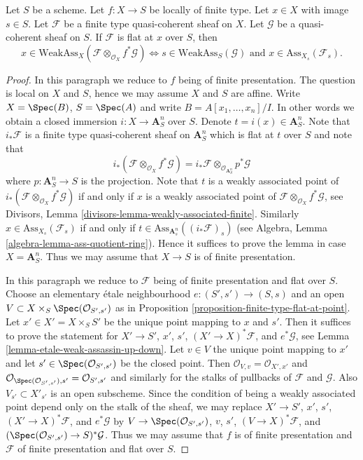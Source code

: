 \begin{lemma}
\label{lemma-bourbaki-finite-type-general-base-at-point}
Let $S$ be a scheme.
Let $f : X \to S$ be locally of finite type.
Let $x \in X$ with image $s \in S$.
Let $\mathcal{F}$ be a finite type quasi-coherent sheaf on $X$.
Let $\mathcal{G}$ be a quasi-coherent sheaf on $S$.
If $\mathcal{F}$ is flat at $x$ over $S$, then
$$
x \in \text{WeakAss}_X(\mathcal{F} \otimes_{\mathcal{O}_X} f^*\mathcal{G})
\Leftrightarrow
s \in \text{WeakAss}_S(\mathcal{G})
\text{ and }
x \in \text{Ass}_{X_s}(\mathcal{F}_s).
$$
\end{lemma}

\begin{proof}
In this paragraph we reduce to $f$ being of finite presentation.
The question is local on $X$ and $S$, hence we may assume $X$ and $S$
are affine. Write $X = \Spec(B)$, $S = \Spec(A)$ and write
$B = A[x_1, \ldots, x_n]/I$. In other words we obtain a closed immersion
$i : X \to \mathbf{A}^n_S$ over $S$. Denote $t = i(x) \in \mathbf{A}^n_S$.
Note that $i_*\mathcal{F}$ is a finite type quasi-coherent sheaf on
$\mathbf{A}^n_S$ which is flat at $t$ over $S$ and note that
$$
i_*(\mathcal{F} \otimes_{\mathcal{O}_X} f^*\mathcal{G}) =
i_*\mathcal{F} \otimes_{\mathcal{O}_{\mathbf{A}^n_S}} p^*\mathcal{G}
$$
where $p : \mathbf{A}^n_S \to S$ is the projection. Note that
$t$ is a weakly associated point of
$i_*(\mathcal{F} \otimes_{\mathcal{O}_X} f^*\mathcal{G})$
if and only if $x$ is a weakly associated point of
$\mathcal{F} \otimes_{\mathcal{O}_X} f^*\mathcal{G}$, see
Divisors, Lemma \ref{divisors-lemma-weakly-associated-finite}.
Similarly $x \in \text{Ass}_{X_s}(\mathcal{F}_s)$ if and only
if $t \in \text{Ass}_{\mathbf{A}^n_s}((i_*\mathcal{F})_s)$ (see
Algebra, Lemma \ref{algebra-lemma-ass-quotient-ring}).
Hence it suffices to prove the lemma in case $X = \mathbf{A}^n_S$.
Thus we may assume that $X \to S$ is of finite presentation.

\medskip\noindent
In this paragraph we reduce to $\mathcal{F}$ being of finite presentation
and flat over $S$.
Choose an elementary \'etale neighbourhood $e : (S', s') \to (S, s)$
and an open $V \subset X \times_S \Spec(\mathcal{O}_{S', s'})$
as in Proposition \ref{proposition-finite-type-flat-at-point}.
Let $x' \in X' = X \times_S S'$ be the unique point mapping to $x$
and $s'$. Then it suffices to prove the statement for
$X' \to S'$, $x'$, $s'$, $(X' \to X)^*\mathcal{F}$, and $e^*\mathcal{G}$, see
Lemma \ref{lemma-etale-weak-assassin-up-down}.
Let $v \in V$ the unique point mapping to $x'$
and let $s' \in \Spec(\mathcal{O}_{S', s'})$ be the closed point.
Then $\mathcal{O}_{V, v} = \mathcal{O}_{X', x'}$
and $\mathcal{O}_{\Spec(\mathcal{O}_{S', s'}), s'} =
\mathcal{O}_{S', s'}$ and similarly for the stalks of pullbacks of
$\mathcal{F}$ and $\mathcal{G}$.
Also $V_{s'} \subset X'_{s'}$ is an open subscheme.
Since the condition of being a weakly associated point
depend only on the stalk of the sheaf, we may
replace
$X' \to S'$, $x'$, $s'$, $(X' \to X)^*\mathcal{F}$, and $e^*\mathcal{G}$
by
$V \to \Spec(\mathcal{O}_{S', s'})$, $v$, $s'$, $(V \to X)^*\mathcal{F}$,
and $(\Spec(\mathcal{O}_{S', s'}) \to S)^*\mathcal{G}$.
Thus we may assume that $f$ is of finite presentation and
$\mathcal{F}$ of finite presentation and flat over $S$.


\end{proof}
